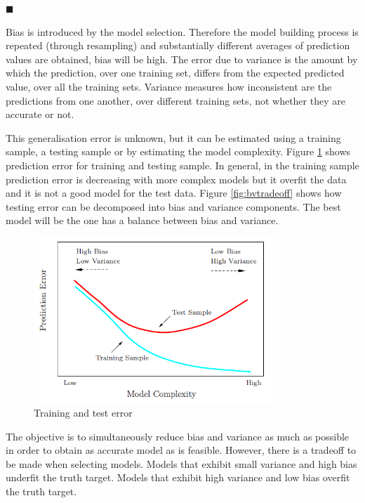 $\blacksquare$

Bias is introduced by the model selection. Therefore the model building process is repeated (through resampling) and substantially different averages of prediction values are obtained, bias will be high. The error due to variance is the amount by which the prediction, over one training set, differs from the expected predicted value, over all the training sets. Variance measures how inconsistent are the predictions from one another, over different training sets, not whether they are accurate or not.

This generalisation error is unknown, but it can be estimated using a training sample, a testing sample or by estimating the model complexity. Figure \ref{fig:traintesterror} shows prediction error for training and testing sample.  In general, in the training sample prediction error is decreasing with more complex models but it overfit the data and it is not a good model for the test data. Figure \ref{fig:bvtradeoff} shows how testing error can be decomposed into bias and variance components. The best model will be the one has a balance between bias and variance.

\begin{figure}[!h]
  \centering
  \includegraphics[width=0.8\textwidth]{img/model_complexity}
  \caption{Training and test error}
  \label{fig:traintesterror}
\end{figure}


The objective is to simultaneously reduce bias and variance as much as possible in order to obtain as accurate model as is feasible.  However, there is a tradeoff to be made when selecting models. Models that exhibit small variance and high bias underfit the truth target.  Models that exhibit high variance and low bias overfit the truth target.

